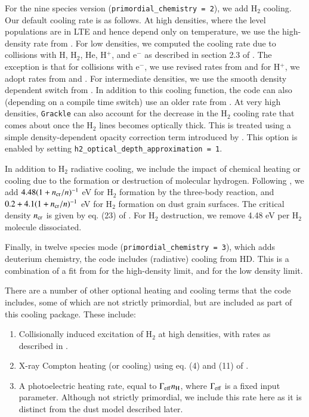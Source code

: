 For the nine species version (\texttt{primordial\_chemistry = 2}), we add H$_2$ cooling.  Our default cooling rate is as follows.  At high densities, where the level populations are in LTE and hence depend only on temperature, we use the high-density rate from \citet{1998A&A...335..403G}. For low densities, we computed the cooling rate due to collisions with H, H$_2$, He, H$^+$, and e$^-$ as described in section 2.3 of  \citet{2008MNRAS.388.1627G}.  The exception is that for collisions with e$^-$, we use revised rates from \citet{yoon2008cross} and for H$^+$, we adopt rates from \citet{2011PhRvL.107b3201H} and \citet{2012PhRvL.108j9903H}.  For intermediate densities, we use the smooth density dependent switch from \citet{1998A&A...335..403G}.  In addition to this cooling function, the code can also (depending on a compile time switch) use an older rate from \citet{1983ApJ...270..578L}. At very high densities, \texttt{Grackle} can also account for the decrease in the H$_{2}$ cooling rate that comes about once the H$_{2}$ lines becomes optically thick. This is treated using a simple density-dependent opacity correction term introduced by \citet{2004MNRAS.348.1019R}. This option is enabled by setting \texttt{h2\_optical\_depth\_approximation = 1}.

\label{sec:chemheat}

In addition to H$_2$ radiative cooling, we include the impact of chemical heating or cooling due to the formation or destruction of molecular hydrogen.  Following \citet{2000ApJ...534..809O}, we add $4.48 (1 + n_{\rm cr}/n)^{-1}$ eV for H$_2$ formation by the three-body reaction, and $0.2 + 4.1(1 + n_{\rm cr}/n)^{-1}$ eV for H$_2$ formation on dust grain surfaces.  The critical density $n_{\rm cr}$ is given by eq. (23) of  \citet{2000ApJ...534..809O}.  For H$_2$ destruction, we remove 4.48 eV per H$_2$ molecule dissociated.

Finally, in twelve species mode (\texttt{primordial\_chemistry = 3}), which adds deuterium chemistry, the code includes (radiative) cooling from HD.  This is a combination of a fit from \citet{2011MNRAS.415..487C} for the high-density limit, and \citet{2007MNRAS.382..133W} for the low density limit.

There are a number of other optional heating and cooling terms that the code includes, some of which are not strictly primordial, but are included as part of this cooling package.  These include:  
\begin{enumerate}
\item Collisionally induced excitation of H$_2$ at high densities, with rates as described in \citet{2004MNRAS.348.1019R}.
\item X-ray Compton heating (or cooling) using eq. (4) and (11) of \citet{1999ApJ...517L...9M}.
\item A photoelectric heating rate, equal to $\Gamma_{\rm eff} n_{\rm H}$, where $\Gamma_{\rm eff}$ is a fixed input parameter.  Although not strictly primordial, we include this rate here as it is distinct from the dust model described later.
\end{enumerate}


